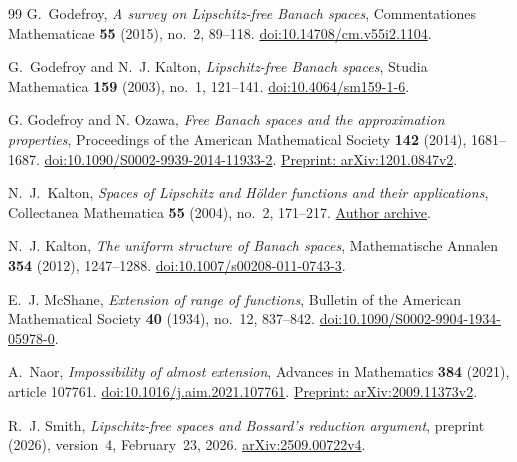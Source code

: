 \begin{thebibliography}{99}
G.~Godefroy,
\emph{A survey on Lipschitz-free Banach spaces},
Commentationes Mathematicae \textbf{55} (2015), no.~2, 89--118.
\href{https://doi.org/10.14708/cm.v55i2.1104}{doi:10.14708/cm.v55i2.1104}.

G.~Godefroy and N.~J. Kalton,
\emph{Lipschitz-free Banach spaces},
Studia Mathematica \textbf{159} (2003), no.~1, 121--141.
\href{https://doi.org/10.4064/sm159-1-6}{doi:10.4064/sm159-1-6}.

G. Godefroy and N. Ozawa,
\emph{Free Banach spaces and the approximation properties},
Proceedings of the American Mathematical Society \textbf{142} (2014),
1681--1687.
\href{https://doi.org/10.1090/S0002-9939-2014-11933-2}{doi:10.1090/S0002-9939-2014-11933-2}.
\href{https://arxiv.org/abs/1201.0847v2}{Preprint: arXiv:1201.0847v2}.

N.~J.~Kalton,
\emph{Spaces of Lipschitz and H\"older functions and their applications},
Collectanea Mathematica \textbf{55} (2004), no.~2, 171--217.
\href{https://kaltonmemorial.missouri.edu/assets/docs/collect2004.pdf}{Author archive}.

N.~J. Kalton,
\emph{The uniform structure of Banach spaces},
Mathematische Annalen \textbf{354} (2012), 1247--1288.
\href{https://doi.org/10.1007/s00208-011-0743-3}{doi:10.1007/s00208-011-0743-3}.

E.~J. McShane,
\emph{Extension of range of functions},
Bulletin of the American Mathematical Society \textbf{40} (1934),
no.~12, 837--842.
\href{https://doi.org/10.1090/S0002-9904-1934-05978-0}{doi:10.1090/S0002-9904-1934-05978-0}.

A.~Naor,
\emph{Impossibility of almost extension},
Advances in Mathematics \textbf{384} (2021), article 107761.
\href{https://doi.org/10.1016/j.aim.2021.107761}{doi:10.1016/j.aim.2021.107761}.
\href{https://arxiv.org/abs/2009.11373v2}{Preprint: arXiv:2009.11373v2}.

R.~J. Smith,
\emph{Lipschitz-free spaces and Bossard's reduction argument},
preprint (2026), version~4, February~23, 2026.
\href{https://arxiv.org/abs/2509.00722v4}{arXiv:2509.00722v4}.

\end{thebibliography}
